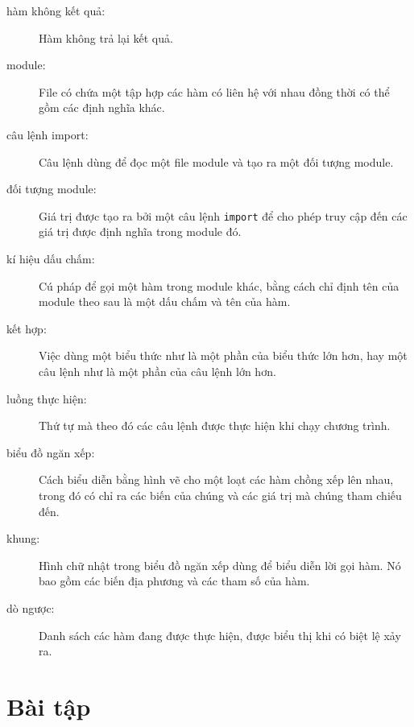 \documentclass[11pt]{book}
\begin{document}
\begin{description}
\item[hàm không kết quả:] Hàm không trả lại kết quả.

\item[module:] File có chứa một tập hợp các hàm có liên hệ với nhau
đồng thời có thể gồm các định nghĩa khác.

\item[câu lệnh import:] Câu lệnh dùng để đọc một file module và tạo
ra một đối tượng module.

\item[đối tượng module:] Giá trị được tạo ra bởi một câu lệnh {\tt import}
để cho phép truy cập đến các giá trị được định nghĩa trong module đó.

\item[kí hiệu dấu chấm:]  Cú pháp để gọi một hàm trong module khác,
bằng cách chỉ định tên của module theo sau là một dấu chấm và tên của hàm.

\item[kết hợp:] Việc dùng một biểu thức như là một phần của biểu thức lớn hơn,
hay một câu lệnh như là một phần của câu lệnh lớn hơn.

\item[luồng thực hiện:]  Thứ tự mà theo đó các câu lệnh được thực hiện khi chạy
chương trình.

\item[biểu đồ ngăn xếp:]  Cách biểu diễn bằng hình vẽ cho một loạt các hàm 
chồng xếp lên nhau, trong đó có chỉ ra các biến của chúng và các giá trị mà chúng
tham chiếu đến.

\item[khung:]  Hình chữ nhật trong biểu đồ ngăn xếp dùng để biểu diễn lời
gọi hàm. Nó bao gồm các biến địa phương và các tham số của hàm.

\item[dò ngược:]  Danh sách các hàm đang được thực hiện, được biểu thị khi có
biệt lệ xảy ra.


\end{description}


\section{Bài tập}
\end{document}
